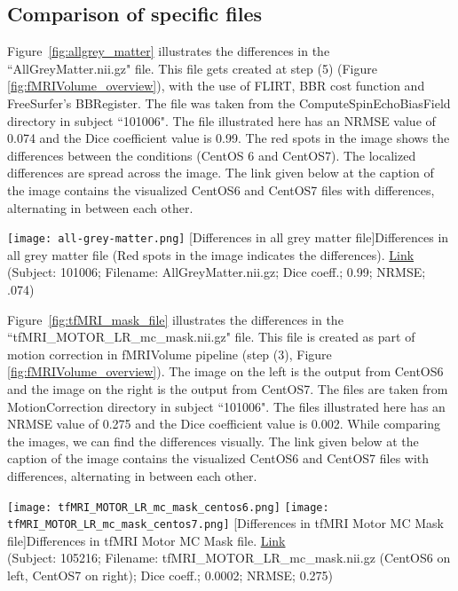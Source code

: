 \subsection{Comparison of specific files}
Figure~\ref{fig:allgrey_matter} illustrates the differences in the ``AllGreyMatter.nii.gz" file. This file gets created at step (5) (Figure \ref{fig:fMRIVolume_overview}), with the use of FLIRT, BBR cost function and FreeSurfer's BBRegister. The file was taken from the ComputeSpinEchoBiasField directory in subject ``101006". The file illustrated here has an NRMSE value of 0.074 and the Dice coefficient value is 0.99. The red spots in the image shows the differences between the conditions (CentOS 6 and CentOS7). The localized differences are spread across the image. The link given below at the caption of the image contains the visualized CentOS6 and CentOS7 files with differences, alternating in between each other.

\begin{center}
\texttt{[image: all-grey-matter.png]}
[Differences in all grey matter file]{Differences in all grey matter file (Red spots in the image indicates the differences). \href{https://drive.google.com/file/d/1dzpyMalJ6_ox8jLedKvhKrP2ew7C7N-r/view?usp=sharing}{Link}\\{(Subject: 101006; Filename: AllGreyMatter.nii.gz; Dice coeff.; 0.99; NRMSE; .074)}}
\label{fig:allgrey_matter}
\end{center}

Figure~\ref{fig:tfMRI_mask_file} illustrates the differences in the ``tfMRI\_MOTOR\_LR\_mc\_mask.nii.gz" file. This file is created as part of motion correction in fMRIVolume pipeline (step (3), Figure \ref{fig:fMRIVolume_overview}). The image on the left is the output from CentOS6 and the image on the right is the output from CentOS7. The files are taken from MotionCorrection directory in subject ``101006". The files illustrated here has an NRMSE value of 0.275 and the Dice coefficient value is 0.002. While comparing the images, we can find the differences visually.
The link given below at the caption of the image contains the visualized CentOS6 and CentOS7 files with differences, alternating in between each other.

\begin{center}
\texttt{[image: tfMRI\_MOTOR\_LR\_mc\_mask\_centos6.png]}%
\texttt{[image: tfMRI\_MOTOR\_LR\_mc\_mask\_centos7.png]}
  [Differences in tfMRI Motor MC Mask file]{Differences in tfMRI Motor MC Mask file. \href{https://drive.google.com/file/d/1_XpZnroleOlJmkvXHZA84iknT5UxtO14/view?usp=sharing}{Link}\\(Subject: 105216; Filename: tfMRI\_MOTOR\_LR\_mc\_mask.nii.gz (CentOS6 on left, CentOS7 on right); Dice coeff.; 0.0002; NRMSE; 0.275)}
\label{fig:tfMRI_mask_file}
\end{center}

